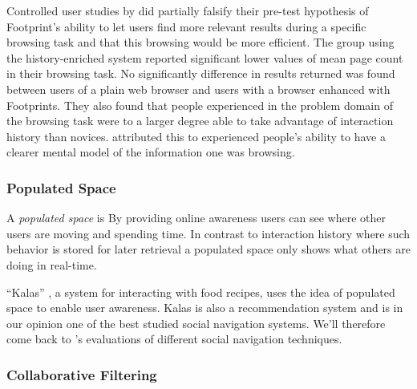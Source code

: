 Controlled user studies by \citeauthor{wexelblat99} did partially falsify
their pre-test hypothesis of Footprint's ability to let users find more
relevant results during a specific browsing task and that this browsing
would be more efficient. The group using the history-enriched system reported
significant lower values of mean page count in their browsing task. No
significantly difference in results returned was found between users of a
plain web browser and users with a browser enhanced with Footprints. They also
found that people experienced in the problem domain of the browsing task were
to a larger degree able to take advantage of interaction history than novices.
\citeauthor{wexelblat99} attributed this to experienced people's ability to
have a clearer mental model of the information one was browsing.


\subsubsection{Populated Space}

A \emph{populated space} is
By providing online awareness users can see where other users are moving and
spending time. In contrast to interaction history where such behavior is
stored for later retrieval a populated space only shows what others are doing
in real-time.

``Kalas'' \citep{svensson05}, a system for interacting with food recipes,
uses the idea of populated space to enable user awareness. Kalas is also a
recommendation system and is in our opinion one of the best studied social
navigation systems. We'll therefore come back to \citeauthor{svensson05}'s
evaluations of different social navigation techniques.

\subsubsection{Collaborative Filtering}
\label{section:background.social.navigation.applied.forms.collaborative.filtering}


